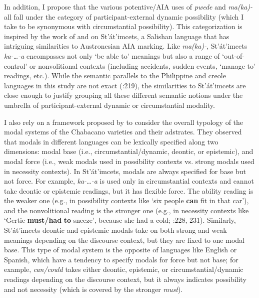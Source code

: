 In addition, I propose that the various potentive/AIA uses of \textit{pwede} and \textit{ma(ka)-} all fall under the category of participant-external dynamic possibility (which I take to be synonymous with circumstantial possibility). This categorization is inspired by the work of \citet{MatthewsonEtAl2005} and \citet{DavisEtAl2009} on St’át’imcets, a Salishan language that has intriguing similarities to Austronesian AIA marking. Like \textit{ma(ka)-}, St’át’imcets \textit{ka-…-a} encompasses not only ‘be able to’ meanings but also a range of ‘out-of-control’ or nonvolitional contexts (including accidents, sudden events, ‘manage to’ readings, etc.). While the semantic parallels to the Philippine and creole languages in this study are not exact (\citealt{DavisEtAl2009}:219), the similarities to St’át’imcets are close enough to justify grouping all these different semantic notions under the umbrella of participant-external dynamic or circumstantial modality. 

I also rely on a framework proposed by \citet{MatthewsonEtAl2005} to consider the overall typology of the modal systems of the Chabacano varieties and their adstrates. They observed that modals in different languages can be lexically specified along two dimensions: modal base (i.e., circumstantial/dynamic, deontic, or epistemic), and modal force (i.e., weak modals used in possibility contexts vs. strong modals used in necessity contexts). In St’át’imcets, modals are always specified for base but not force. For example, \textit{ka-…-a} is used only in circumstantial contexts and cannot take deontic or epistemic readings, but it has flexible force. The ability reading is the weaker one (e.g., in possibility contexts like ‘six people \textbf{can} fit in that car’), and the nonvolitional reading is the stronger one (e.g., in necessity contexts like ‘Gertie \textbf{must/had} \textbf{to} sneeze’, because she had a cold; \citealt{DavisEtAl2009}:228, 231). Similarly, St’át’imcets deontic and epistemic modals take on both strong and weak meanings depending on the discourse context, but they are fixed to one modal base. This type of modal system is the opposite of languages like English or Spanish, which have a tendency to specify modals for force but not base; for example, \textit{can/could} takes either deontic, epistemic, or circumstantial/dynamic readings depending on the discourse context, but it always indicates possibility and not necessity (which is covered by the stronger \textit{must}).

